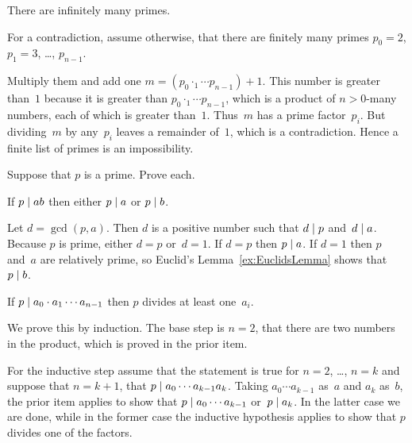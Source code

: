 \documentclass{ibl}  %
\begin{document}
\begin{problem} 
There are infinitely many primes.  
\begin{answer}
For a contradiction, assume otherwise,
that there are finitely many primes 
$p_0=2$, $p_1=3$, \ldots, $p_{n-1}$.

Multiply them and add one $m=(p_0\cdotp_1\cdots p_{n-1})+1$.
This number is greater than~$1$ because it is greater than 
$p_0\cdotp_1\cdots p_{n-1}$, 
which is a product of $n>0$-many numbers, each of which is greater than~$1$.
Thus~$m$ has a prime factor~$p_i$.
But dividing~$m$ by any~$p_i$ 
leaves a remainder of~$1$, which
is a contradiction. 
Hence a finite
list of primes is an impossibility.
\end{answer}
\end{problem}

\begin{problem} 
Suppose that $p$ is a prime.  Prove each.\label{ex:EuclidsOtherLemma}
\begin{exes}
\begin{exercise} 
  If  $p\mid ab$ then either $p\mid a$ or $p\mid b$.
\end{exercise}
\begin{answer}
  Let $d=\gcd(p,a)$.
  Then $d$ is a positive number such that $d\mid p$ and~$d\mid a$.
  Because $p$ is prime, either $d=p$ or~$d=1$.
  If $d=p$ then $p\mid a$.
  If $d=1$ then $p$ and~$a$ are relatively prime, 
  so Euclid's Lemma~\ref{ex:EuclidsLemma} shows that 
  $p\mid b$.
\end{answer}
\begin{exercise} 
  If $p\mid a_0\cdot a_1\cdots a_{n-1}$ then $p$ divides at least one~$a_i$.
\end{exercise}
\begin{answer}
  We prove this by induction.
  The base step is $n=2$, that there are two numbers in the product, which
  is proved in the prior item.

  For the inductive step assume that the statement is true for $n=2$, \ldots,
  $n=k$ and suppose that $n=k+1$, that $p\mid a_0\cdots a_{k-1}a_k$.
  Taking $a_0\cdots a_{k-1}$ as~$a$ and $a_k$ as~$b$, the prior item applies
  to show that $p\mid a_0\cdots a_{k-1}$ or~$p\mid a_k$.
  In the latter case we are done, while in the former case the
  inductive hypothesis applies to show that $p$ divides one of the factors.  
\end{answer}
\end{exes}
\end{problem}
\end{document}
